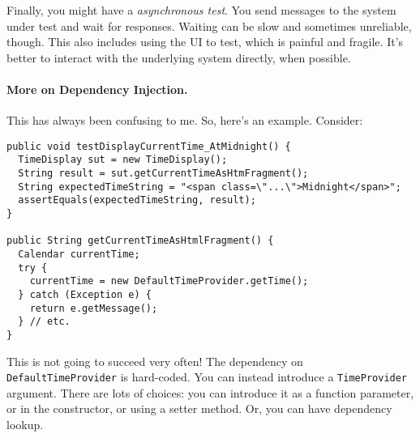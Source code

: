 \documentclass[11pt]{article}
\begin{document}
Finally, you might have a \emph{asynchronous test}. You send messages
to the system under test and wait for responses. Waiting can be slow
and sometimes unreliable, though. This also includes using the UI to
test, which is painful and fragile. It's better to interact with the
underlying system directly, when possible.

\paragraph{More on Dependency Injection.} This has always been confusing to
me. So, here's an example. Consider:

\begin{lstlisting}
public void testDisplayCurrentTime_AtMidnight() {
  TimeDisplay sut = new TimeDisplay();
  String result = sut.getCurrentTimeAsHtmFragment();
  String expectedTimeString = "<span class=\"...\">Midnight</span>";
  assertEquals(expectedTimeString, result);
}

public String getCurrentTimeAsHtmlFragment() {
  Calendar currentTime;
  try {
    currentTime = new DefaultTimeProvider.getTime();
  } catch (Exception e) {
    return e.getMessage();
  } // etc.
}
\end{lstlisting}

This is not going to succeed very often! The dependency on
{\tt DefaultTimeProvider} is hard-coded. You can instead 
introduce a {\tt TimeProvider} argument. There are lots of choices:
you can introduce it as a function parameter, or in the constructor,
or using a setter method. Or, you can have dependency lookup.
\end{document}
